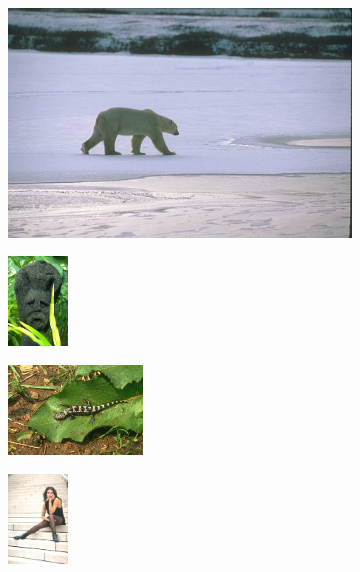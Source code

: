 \documentclass[journal]{IEEEtran}
\begin{document}
\begin{figure}[!ht]
         
    \begin{subfigure}[t]{\textwidth+20pt\relax}
    	\centering
    	\includegraphics[width=\dimexpr\linewidth-20pt\relax]{100007} 
    \end{subfigure}      
    \begin{subfigure}[b]{0.23\textwidth}
    	\centering
        \includegraphics[height=67.68857pt]{101084}
    \end{subfigure}
    \begin{subfigure}[b]{0.23\textwidth}
    	\centering
        \includegraphics[height=67.68857pt]{175083}
    \end{subfigure}
    \begin{subfigure}[b]{0.23\textwidth}
    	\centering
        \includegraphics[height=67.68857pt]{181021}
    \end{subfigure} \\ 
    

\end{figure}
\end{document}
